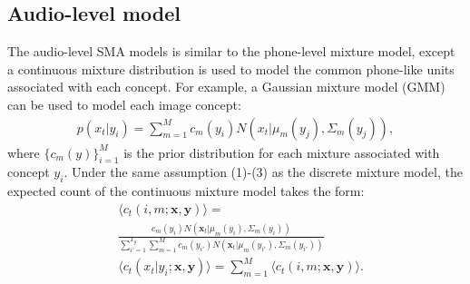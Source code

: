 \documentclass[journal]{IEEEtran}
\begin{document}

\subsection{Audio-level model}
The audio-level SMA models is similar to the phone-level mixture model, except a continuous mixture distribution is used to model the common phone-like units associated with each concept. For example, a Gaussian mixture model (GMM) can be used to model each image concept:
\begin{align}\label{eq:gmm_prob}
    p(x_t|y_i) = \sum_{m=1}^{M} c_m(y_i) N( x_t|\mu_m(y_j), \Sigma_m(y_j)),
\end{align}
where $\{c_m(y)\}_{i=1}^M$ is the prior distribution for each mixture associated with concept $y_i$. Under the same assumption (1)-(3) as the discrete mixture model, the expected count of the continuous mixture model takes the form:
\begin{align}\label{eq:expected_count_gmm}
    &\langle c_t(i, m;\mathbf x, \mathbf y) \rangle =\nonumber\\ &\frac{c_{m}(y_{i})N(\mathbf x_t|\mu_{m}(y_{i}), \Sigma_{m}(y_{i}))}{\sum_{i'=1}^{T_y} \sum_{m=1}^M c_m(y_{i'})N(\mathbf x_t|\mu_m(y_{i'}), \Sigma_m(y_{i'}))} \\
    &\langle c_t(x_t|y_{i}; \mathbf x, \mathbf y) \rangle = \sum_{m=1}^M \langle c_t(i, m; \mathbf x, \mathbf y) \rangle.
\end{align}
\end{document}

